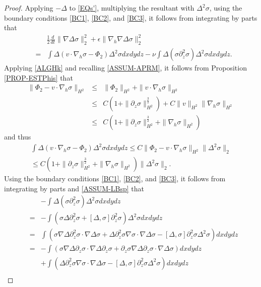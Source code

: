 \documentclass[12pt,reqno]{amsart}
\numberwithin{equation}{section}
\begin{document}
\begin{proof}
Applying $-\Delta$ to \eqref{EQs'}, multiplying the resultant with $\Delta^2\sigma$, using the boundary conditions \eqref{BC1}, \eqref{BC2}, and \eqref{BC3}, it follows from integrating by parts that
\begin{eqnarray}
  &&\frac12\frac{d}{dt}\|\nabla\Delta\sigma\|_2^2+\epsilon\|\nabla_h\nabla\Delta\sigma\|_2^2\nonumber\\
  &=&\int\Delta(v\cdot\nabla_h\sigma-\Phi_2)\Delta^2\sigma dxdydz-\nu\int\Delta(\sigma\partial_z^2\sigma)\Delta^2\sigma dxdydz. \label{920-1}
\end{eqnarray}
Applying \eqref{ALGHk} and recalling \eqref{ASSUM-APRM}, it follows from Proposition \eqref{PROP-ESTPhis} that
\begin{eqnarray*}
  \|\Phi_2-v\cdot\nabla_h\sigma\|_{H^2}&\leq&\|\Phi_2\|_{H^2}+\|v\cdot\nabla_h\sigma\|_{H^2}\nonumber\\
  &\leq& C\left(1+\|\partial_z\sigma\|_{H^2}^\frac32\right)+C\|v\|_{H^2}\|\nabla_h\sigma\|_{H^2}\nonumber\\
  &\leq& C\left(1+\|\partial_z\sigma\|_{H^2}^\frac32+\|\nabla_h\sigma\|_{H^2}\right)
\end{eqnarray*}
and thus
\begin{eqnarray}
  \int\Delta(v\cdot\nabla_h\sigma-\Phi_2)\Delta^2\sigma dxdydz\leq C\|\Phi_2-v\cdot\nabla_h\sigma\|_{H^2}\|\Delta^2\sigma\|_2\nonumber\\
  \leq C\left(1+\|\partial_z\sigma\|_{H^2}^\frac32+\|\nabla_h\sigma\|_{H^2}\right)\|\Delta^2\sigma\|_2. \label{EQ35}
\end{eqnarray}
Using the boundary conditions \eqref{BC1}, \eqref{BC2}, and \eqref{BC3}, it follows from integrating by parts and \eqref{ASSUM-LBsp}
that
\begin{eqnarray}
  &&-\int\Delta(\sigma\partial_z^2\sigma)\Delta^2\sigma dxdydz\nonumber\\
  &=&-\int(\sigma\Delta\partial_z^2\sigma+[\Delta,\sigma]\partial_z^2\sigma)\Delta^2\sigma dxdydz\nonumber\\
  &=&\int(\sigma\nabla\Delta\partial_z^2\sigma\cdot\nabla\Delta\sigma+\Delta\partial_z^2\sigma\nabla\sigma\cdot\nabla\Delta\sigma-[\Delta,\sigma]\partial_z^2\sigma\Delta^2\sigma)dxdydz\nonumber\\
  &=&-\int(\sigma\nabla\Delta\partial_z\sigma\cdot\nabla\Delta\partial_z\sigma+\partial_z\sigma\nabla\Delta\partial_z
  \sigma\cdot\nabla\Delta\sigma)dxdydz\nonumber\\
  &&+\int(\Delta\partial_z^2\sigma\nabla\sigma\cdot\nabla\Delta\sigma-[\Delta,\sigma]\partial_z^2\sigma\Delta^2\sigma)dxdydz\nonumber\\

\end{eqnarray}
\end{proof}
\end{document}
